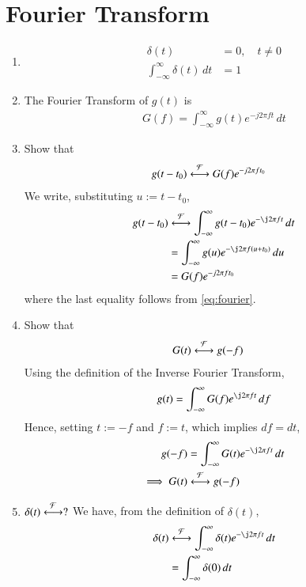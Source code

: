 \documentclass[journal,12pt,twocolumn]{IEEEtran}
\renewcommand\thesection{\arabic{section}}
\begin{document}
\section{Fourier Transform}
\begin{enumerate}[label=\thesection.\arabic*
,ref=\thesection.\theenumi]
\item 
\begin{align}
	\delta(t)&=0, \quad t\neq 0 \\
	\int_{-\infty}^{\infty}\delta(t) \, dt&= 1
\end{align}
\item The Fourier Transform of $g(t)$ is
\begin{align}
G(f)=\int_{-\infty}^{\infty}g(t)e^{-j2\pi ft}\,dt
\label{eq:fourier}
\end{align}
\item Show that 
\begin{align}
    g(t-t_0)&\overset{\mathcal{F}}{ \longleftrightarrow}G(f)e^{-j2\pi ft_0}
    \label{eq:t-shift}
\end{align}
\solution We write, substituting $u := t-t_0$,
\begin{align}
    g(t-t_0)&\system{F}\int_{-\infty}^{\infty}
            g(t-t_0)e^{-\j2\pi ft}\,dt \\
            &=\int_{-\infty}^{\infty}
            g(u)e^{-\j2\pi f(u + t_0)}\,du \\
            &=G(f)e^{-j2\pi ft_0}
\end{align}
where the last equality follows from \eqref{eq:fourier}.
\item Show that
\begin{align}
    G(t)&\overset{\mathcal{F}}{ \longleftrightarrow}g(-f)
\end{align}
\solution Using the definition of the Inverse Fourier Transform,
\begin{align}
    g(t)=\int_{-\infty}^{\infty}G(f)e^{\j2\pi ft}\,df
    \label{eq:duality}
\end{align}
Hence, setting $t := -f$ and $f := t$, which implies $df = dt$,
\begin{align}
    g(-f)&=\int_{-\infty}^{\infty}G(t)e^{-\j2\pi ft}\,dt \\
    \implies G(t)&\system{F}g(-f)
\end{align}
\item $\delta(t)\overset{\mathcal{F}}{ \longleftrightarrow}?$
\solution We have, from the definition of $\delta(t)$,
\begin{align}
    \delta(t)&\system{F}\int_{-\infty}^{\infty}\delta(t)e^{-\j2\pi ft}\, dt \\
             &=\int_{-\infty}^{\infty}\delta(0)\, dt \\

\end{align}
\end{enumerate}
\end{document}

